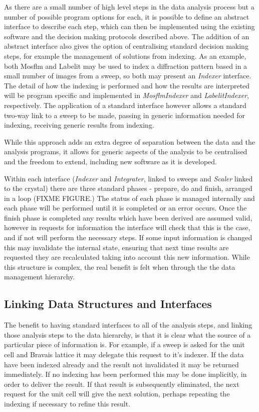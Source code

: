 \documentclass[preprint,pdf]{iucr}
\begin{document}
As there are a small number of high level steps in the data analysis
process but a number of possible program options for each, it is
possible to define an abstract interface to describe each step, which
can then be implemented using the existing software 
and the decision making protocols described above. The addition of an
abstract interface also gives the option of centralising standard
decision making steps, for example the management of solutions from
indexing. As an example, both Mosflm and Labelit may be used to index
a diffraction pattern based in a small number of images from a sweep,
so both may present an \emph{Indexer} interface. The detail of how the
indexing is performed and how the results are interpreted will be
program specific and implemented in \emph{MosflmIndexer} and
\emph{LabelitIndexer}, respectively. The application of a standard
interface however allows a standard two-way link to a sweep to be
made, passing in generic information needed for indexing, receiving
generic results from indexing.

While this approach adds an extra degree of separation between the
data and the analysis programs, it allows for generic aspects of the
analysis to be centralised and the freedom to extend, including
new software as it is developed. 

Within each interface (\emph{Indexer} and \emph{Integrater}, linked to
sweeps and 
\emph{Scaler} linked to the crystal) there are three standard phases -
prepare, do and 
finish, arranged in a loop (FIXME FIGURE.) The status of each phase is
managed internally and each phase will be performed until it is
completed or an error occurs. Once the finish phase is completed any
results which have been derived are assumed valid, however in requests
for information the interface will check that this is the case, and if
not will perform the necessary steps. If some input information is
changed this may invalidate the internal state, ensuring that next
time results are requested they are recalculated taking into account
this new information. While this structure is complex, the
real benefit is felt when through the the data management hierarchy.

\subsection{Linking Data Structures and Interfaces}

The benefit to having standard interfaces to all of the analysis
steps, and linking those analysis steps to the data hierarchy, is that
it is clear what the source of a particular piece of information
is. For example, if a sweep is asked for the unit cell and Bravais
lattice it may delegate this request to it's indexer. If the data have
been indexed already and the result not invalidated it may be returned
immediately. If no indexing has been performed this may be done
implicitly, in order to deliver the result. If that result is
subsequently eliminated, the next request for the unit cell will give
the next solution, perhaps repeating the indexing if necessary to
refine this result. 
\end{document}
